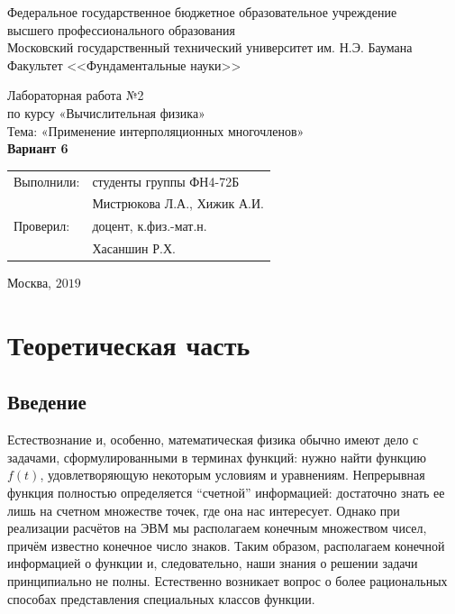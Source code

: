 \documentclass[
11pt,
master, %
subf, %
href, %
colorlinks=true, %
times, %
]{disser}
\begin{document}
	
\pagestyle{empty}
\begin{center}
	
	\noindent  Федеральное государственное бюджетное образовательное учреждение\\
	высшего профессионального образования\\
	
	Московский государственный технический университет им. Н.Э. Баумана \\
	Факультет <<Фундаментальные науки>>\bigskip\\
	
	\vfill
	
	Лабораторная работа №2\\
	по курсу «Вычислительная физика»\\
	Тема: «Применение интерполяционных многочленов»\\
	\textbf{Вариант 6}\\
	
	
	\vfill
	\vfill
	\begin{flushright}
		\begin{tabular}{ll}
			Выполнили: & студенты группы ФН4-72Б     \\
			& Мистрюкова Л.А., Хижик А.И.  \\
			Проверил:  & доцент, к.физ.-мат.н.       \\
			& Хасаншин Р.Х.
		\end{tabular}
	\end{flushright}
	\vfill
	\begin{center}
		Москва, $2019$
	\end{center}
	
\end{center}
\pagebreak


\pagestyle{plain}

\tableofcontents

\section{Теоретическая часть}
\subsection{Введение}
Естествознание и, особенно, математическая физика обычно имеют дело с задачами, сформулированными в терминах функций: нужно найти функцию $f(t)$, удовлетворяющую некоторым условиям и уравнениям. Непрерывная функция полностью определяется ``счетной'' информацией: достаточно знать ее лишь на счетном множестве точек, где она нас интересует. Однако при реализации расчётов на ЭВМ мы располагаем конечным множеством чисел, причём известно конечное число знаков. Таким образом, располагаем конечной информацией о функции и, следовательно, наши знания о решении задачи принципиально не полны. Естественно возникает вопрос о более рациональных способах представления специальных классов функции.
\end{document}
